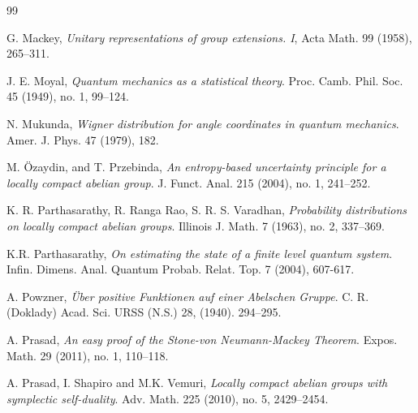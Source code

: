 \documentclass[12pt,reqno]{amsart}
\theoremstyle{definition}
\theoremstyle{definition}
\theoremstyle{definition}
\numberwithin{thm}{section}
\numberwithin{equation}{section}
\begin{document}
\begin{thebibliography}{99}



 G. Mackey,
\textit{Unitary representations of group extensions. I},
Acta Math. 99 (1958), 265--311.


 J. E. Moyal,
\textit{Quantum mechanics as a statistical theory}.
Proc. Camb. Phil. Soc. 45 (1949), no. 1, 99--124.

N. Mukunda, 
\textit{Wigner distribution for angle coordinates in quantum mechanics}. 
Amer. J. Phys.  47 (1979), 182.

 M. \"{O}zaydin, and T. Przebinda,
\textit{An entropy-based uncertainty principle for a locally compact abelian group}. 
J. Funct. Anal. 215 (2004), no. 1, 241--252.

K. R. Parthasarathy, R. Ranga Rao, S. R. S. Varadhan,
\textit{Probability distributions on locally compact abelian groups}.
Illinois J. Math. 7 (1963), no. 2, 337--369.

 K.R. Parthasarathy, 
\textit{On estimating the state of a finite level quantum system}. 
Infin. Dimens. Anal. Quantum Probab. Relat. Top. 7 (2004), 607-617.

 A. Powzner,
\textit{\" Uber positive Funktionen auf einer Abelschen Gruppe}.
C. R. (Doklady) Acad. Sci. URSS (N.S.) 28, (1940). 294–295.

A. Prasad, 
\textit{An easy proof of the Stone-von Neumann-Mackey Theorem}.
Expos. Math. 29 (2011), no. 1, 110--118.

A. Prasad, I. Shapiro and M.K. Vemuri, 
\textit{Locally compact abelian groups with symplectic self-duality}.
Adv. Math. 225 (2010), no. 5, 2429--2454.



\end{thebibliography}
\end{document}
